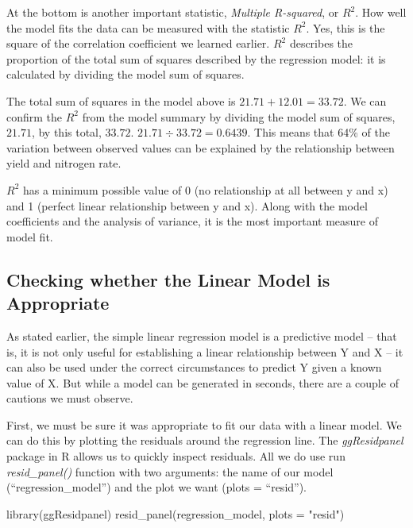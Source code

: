 \documentclass[
]{book}
\newenvironment{Shaded}{\begin{snugshade}}{\end{snugshade}}
\newcommand{\AttributeTok}[1]{\textcolor[rgb]{0.77,0.63,0.00}{#1}}
\newcommand{\FunctionTok}[1]{\textcolor[rgb]{0.00,0.00,0.00}{#1}}
\newcommand{\NormalTok}[1]{#1}
\newcommand{\StringTok}[1]{\textcolor[rgb]{0.31,0.60,0.02}{#1}}
\begin{document}
At the bottom is another important statistic, \emph{Multiple R-squared}, or \(R^2\). How well the model fits the data can be measured with the statistic \(R^2\). Yes, this is the square of the correlation coefficient we learned earlier. \(R^2\) describes the proportion of the total sum of squares described by the regression model: it is calculated by dividing the model sum of squares.

The total sum of squares in the model above is \(21.71 + 12.01 = 33.72\). We can confirm the \(R^2\) from the model summary by dividing the model sum of squares, \(21.71\), by this total, \(33.72\). \(21.71 \div 33.72 = 0.6439\). This means that 64\% of the variation between observed values can be explained by the relationship between yield and nitrogen rate.

\(R^2\) has a minimum possible value of 0 (no relationship at all between y and x) and 1 (perfect linear relationship between y and x). Along with the model coefficients and the analysis of variance, it is the most important measure of model fit.

\hypertarget{checking-whether-the-linear-model-is-appropriate}{%
\subsection{Checking whether the Linear Model is Appropriate}\label{checking-whether-the-linear-model-is-appropriate}}

As stated earlier, the simple linear regression model is a predictive model -- that is, it is not only useful for establishing a linear relationship between Y and X -- it can also be used under the correct circumstances to predict Y given a known value of X. But while a model can be generated in seconds, there are a couple of cautions we must observe.

First, we must be sure it was appropriate to fit our data with a linear model. We can do this by plotting the residuals around the regression line. The \emph{ggResidpanel} package in R allows us to quickly inspect residuals. All we do use run \emph{resid\_panel()} function with two arguments: the name of our model (``regression\_model'') and the plot we want (plots = ``resid'').

\begin{Shaded}
\begin{Highlighting}[]
\FunctionTok{library}\NormalTok{(ggResidpanel)}
\FunctionTok{resid\_panel}\NormalTok{(regression\_model, }\AttributeTok{plots =} \StringTok{"resid"}\NormalTok{)}
\end{Highlighting}
\end{Shaded}
\end{document}
